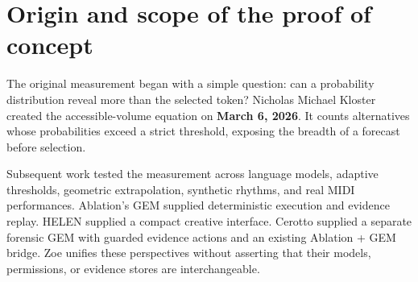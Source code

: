 \documentclass[11pt,a4paper]{article}
\begin{document}
\begin{abstract}
Zoe is a native graphical environment for exploring how forecasts, measurements, beliefs, and actions differ. It unifies HELEN's lightweight geometry and stored predictions, Ablation's Spatial IR and VDI evidence environment, Cerotto's forensic workbench, and BRAIN's deterministic observation and recommendation layer. Its Bayesian field notebook adds questions, competing claims, explicit likelihoods, dependent-evidence barriers, deterministic and stochastic chambers, and append-only memory. This paper documents the complete proof of concept: the accessible-volume equation and its development, temporal and geometric formulations, native GEM versions, Bayesian memory, native interfaces, and independent verification. The work separates measured evidence from interpretation and proposals. Reversed rhythms are learnable under a matched backward model; HOP's geometric predictor is rejected; accessible volume measures breadth rather than correctness. Twenty-five Zoe tests, 20 broader GEM tests, and 17 conformance checks pass, alongside original model and BioBERT verification, packaging checks, native GUI tests, and a working interactive concept map. Zoe is not a conscious entity, a universal predictor, a diagnostic system, or an autonomous controller. It is a reproducible environment for inspecting alternatives, testing beliefs, preserving evidence, and choosing the next investigation under human direction.
\end{abstract}

\section{Origin and scope of the proof of concept}
The original measurement began with a simple question: can a probability distribution reveal more than the selected token? Nicholas Michael Kloster created the accessible-volume equation on \textbf{March 6, 2026}. It counts alternatives whose probabilities exceed a strict threshold, exposing the breadth of a forecast before selection.

Subsequent work tested the measurement across language models, adaptive thresholds, geometric extrapolation, synthetic rhythms, and real MIDI performances. Ablation's GEM supplied deterministic execution and evidence replay. HELEN supplied a compact creative interface. Cerotto supplied a separate forensic GEM with guarded evidence actions and an existing Ablation + GEM bridge. Zoe unifies these perspectives without asserting that their models, permissions, or evidence stores are interchangeable.
\end{document}
